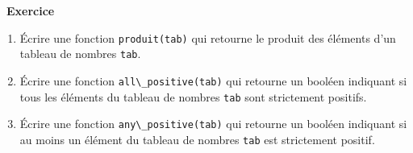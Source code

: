 \documentclass[
  10pt,
]{article}
\newcommand{\passthrough}[1]{#1}
\providecommand{\tightlist}{%
  \setlength{\itemsep}{0pt}\setlength{\parskip}{0pt}}
\newcounter{exo}
\newenvironment{exercice}[1]
{\par \medskip   \addtocounter{exo}{1} \noindent  
\begin{bclogo}[arrondi =0.1,   noborder = true, logo=\bccrayon, marge=4]{~\textbf{Exercice} \textbf{\theexo} {\itshape #1} }  \par}
{
\end{bclogo}
 \par \bigskip }
\newcounter{def}
\begin{document}
\begin{exercice}{}

\begin{enumerate}
\def\labelenumi{\arabic{enumi}.}
\tightlist
\item
  Écrire une fonction \passthrough{\lstinline!produit(tab)!} qui
  retourne le produit des éléments d'un tableau de nombres
  \passthrough{\lstinline!tab!}.
\item
  Écrire une fonction \passthrough{\lstinline!all\_positive(tab)!} qui
  retourne un booléen indiquant si tous les éléments du tableau de
  nombres \passthrough{\lstinline!tab!} sont strictement positifs.
\item
  Écrire une fonction \passthrough{\lstinline!any\_positive(tab)!} qui
  retourne un booléen indiquant si au moins un élément du tableau de
  nombres \passthrough{\lstinline!tab!} est strictement positif.
\end{enumerate}

\end{exercice}
\end{document}
